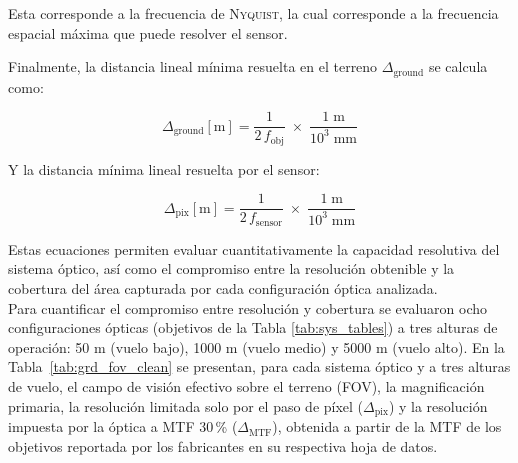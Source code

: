 \noindent Esta corresponde a la frecuencia de \textsc{Nyquist}, la cual corresponde a la frecuencia espacial máxima que puede resolver el sensor.

\noindent Finalmente, la distancia lineal mínima resuelta en el terreno \(\Delta_{\text{ground}}\) se calcula como:

\begin{equation}
    \Delta_{\text{ground}}[\text{m}] =
    \frac{1}{2\,f_{\text{obj}}}\;\times\;
    \frac{1\;\text{m}}{10^{3}\;\text{mm}}
    \label{eq:delta_ground}
\end{equation}

Y la distancia mínima lineal resuelta por el sensor:

\begin{equation}
  \Delta_{\text{pix}}[\text{m}] =
  \frac{1}{2\,f_{\text{sensor}}}\;\times\;
  \frac{1\;\text{m}}{10^{3}\; \text{mm}}
  \label{eq:delta_ground_sensor}
\end{equation}

\noindent Estas ecuaciones permiten evaluar cuantitativamente la capacidad resolutiva del sistema óptico, así como el compromiso entre la resolución obtenible y la cobertura del área capturada por cada configuración óptica analizada.\\

Para cuantificar el compromiso entre resolución y cobertura se evaluaron ocho
configuraciones ópticas (objetivos de la Tabla \ref{tab:sys_tables}) a tres alturas de
operación: 50 m (vuelo bajo), 1000 m (vuelo medio) y 5000 m (vuelo alto). En la Tabla~\ref{tab:grd_fov_clean} se presentan, para cada sistema óptico y a tres alturas de vuelo, el campo de visión efectivo sobre el terreno (FOV), la magnificación primaria, la resolución limitada solo por el paso de píxel (\(\Delta_{\mathrm{pix}}\)) y la resolución impuesta por la óptica a MTF 30\,\% (\(\Delta_{\mathrm{MTF}}\)), obtenida a partir de la MTF de los objetivos reportada por los fabricantes en su respectiva hoja de datos.\\



